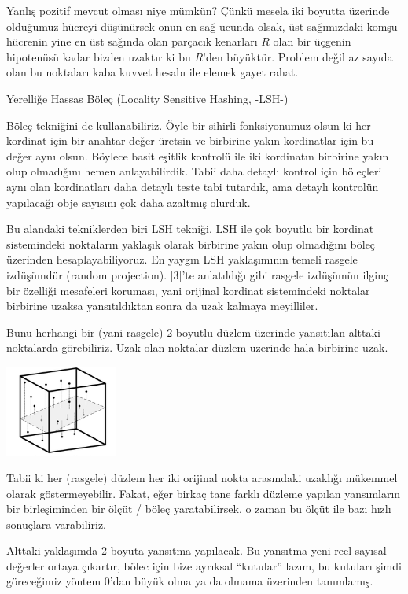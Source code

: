 \documentclass[12pt,fleqn]{article}\usepackage{../../common}
\begin{document}
Yanlış pozitif mevcut olması niye mümkün? Çünkü mesela iki boyutta üzerinde
olduğumuz hücreyi düşünürsek onun en sağ ucunda olsak, üst sağımızdaki komşu
hücrenin yine en üst sağında olan parçacık kenarları $R$ olan bir üçgenin
hipotenüsü kadar bizden uzaktır ki bu $R$'den büyüktür. Problem değil az sayıda
olan bu noktaları kaba kuvvet hesabı ile elemek gayet rahat.

Yerelliğe Hassas Böleç (Locality Sensitive Hashing, -LSH-)

Böleç tekniğini de kullanabiliriz. Öyle bir sihirli fonksiyonumuz olsun ki her
kordinat için bir anahtar değer üretsin ve birbirine yakın kordinatlar için bu
değer aynı olsun. Böylece basit eşitlik kontrolü ile iki kordinatın birbirine
yakın olup olmadığını hemen anlayabilirdik. Tabii daha detaylı kontrol için
böleçleri aynı olan kordinatları daha detaylı teste tabi tutardık, ama detaylı
kontrolün yapılacağı obje sayısını çok daha azaltmış olurduk.

Bu alandaki tekniklerden biri LSH tekniği. LSH ile çok boyutlu bir kordinat
sistemindeki noktaların yaklaşık olarak birbirine yakın olup olmadığını böleç
üzerinden hesaplayabiliyoruz. En yaygın LSH yaklaşımının temeli rasgele
izdüşümdür (random projection). [3]'te anlatıldığı gibi rasgele izdüşümün ilginç
bir özelliği mesafeleri koruması, yani orijinal kordinat sistemindeki noktalar
birbirine uzaksa yansıtıldıktan sonra da uzak kalmaya meyilliler.

Bunu herhangi bir (yani rasgele) 2 boyutlu düzlem üzerinde yansıtılan alttaki
noktalarda görebiliriz. Uzak olan noktalar düzlem uzerinde hala birbirine uzak.

\includegraphics[width=10em]{algs_073_hash_01.png}

Tabii ki her (rasgele) düzlem her iki orijinal nokta arasındaki uzaklığı
mükemmel olarak göstermeyebilir. Fakat, eğer birkaç tane farklı düzleme yapılan
yansımların bir birleşiminden bir ölçüt / böleç yaratabilirsek, o zaman bu ölçüt
ile bazı hızlı sonuçlara varabiliriz.

Alttaki yaklaşımda 2 boyuta yansıtma yapılacak. Bu yansıtma yeni reel sayısal
değerler ortaya çıkartır, bölec için bize ayrıksal ``kutular'' lazım, bu
kutuları şimdi göreceğimiz yöntem 0'dan büyük olma ya da olmama üzerinden
tanımlamış.
\end{document}
